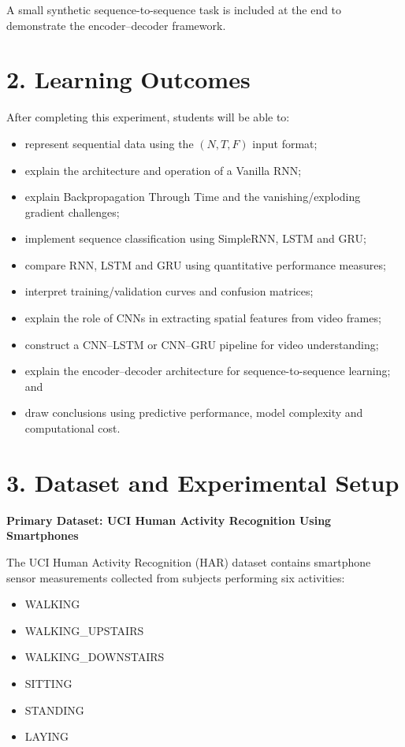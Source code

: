 \documentclass[10pt]{article}
\begin{document}
A small synthetic sequence-to-sequence task is included at the end to
demonstrate the encoder--decoder framework.

\section*{2. Learning Outcomes}

After completing this experiment, students will be able to:

\begin{itemize}
\item represent sequential data using the $(N,T,F)$ input format;
\item explain the architecture and operation of a Vanilla RNN;
\item explain Backpropagation Through Time and the vanishing/exploding gradient challenges;
\item implement sequence classification using SimpleRNN, LSTM and GRU;
\item compare RNN, LSTM and GRU using quantitative performance measures;
\item interpret training/validation curves and confusion matrices;
\item explain the role of CNNs in extracting spatial features from video frames;
\item construct a CNN--LSTM or CNN--GRU pipeline for video understanding;
\item explain the encoder--decoder architecture for sequence-to-sequence learning; and
\item draw conclusions using predictive performance, model complexity and computational cost.
\end{itemize}

\section*{3. Dataset and Experimental Setup}

\textbf{Primary Dataset: UCI Human Activity Recognition Using Smartphones}

The UCI Human Activity Recognition (HAR) dataset contains smartphone sensor
measurements collected from subjects performing six activities:

\begin{itemize}
\item WALKING
\item WALKING\_UPSTAIRS
\item WALKING\_DOWNSTAIRS
\item SITTING
\item STANDING
\item LAYING
\end{itemize}
\end{document}
